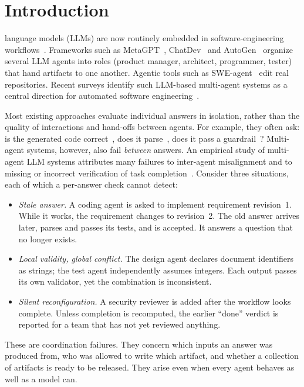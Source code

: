 \documentclass[10pt,journal,compsoc]{IEEEtran}
\theoremstyle{plain}
\theoremstyle{definition}
\begin{document}
\maketitle
\IEEEdisplaynontitleabstractindextext
\IEEEpeerreviewmaketitle

\section{Introduction}\label{sec:intro}
 language models (LLMs) are now routinely embedded in software-engineering workflows~\cite{hou2024llm4se}. Frameworks such as MetaGPT~\cite{metagpt}, ChatDev~\cite{chatdev} and AutoGen~\cite{autogen} organize several LLM agents into roles (product manager, architect, programmer, tester) that hand artifacts to one another. Agentic tools such as SWE-agent~\cite{sweagent} edit real repositories. Recent surveys identify such LLM-based multi-agent systems as a central direction for automated software engineering~\cite{he2025mas,wang2024agents}.

Most existing approaches evaluate individual answers in isolation, rather than the quality of interactions and hand-offs between agents. For example, they often ask: is the generated code correct~\cite{evalplus,swebench}, does it parse~\cite{synchromesh,outlines}, does it pass a guardrail~\cite{nemoguardrails}? Multi-agent systems, however, also fail \emph{between} answers. An empirical study of multi-agent LLM systems attributes many failures to inter-agent misalignment and to missing or incorrect verification of task completion~\cite{cemri2025mast}. Consider three situations, each of which a per-answer check cannot detect:
\begin{itemize}
\item \emph{Stale answer.} A coding agent is asked to implement requirement revision~1. While it works, the requirement changes to revision~2. The old answer arrives later, parses and passes its tests, and is accepted. It answers a question that no longer exists.
\item \emph{Local validity, global conflict.} The design agent declares document identifiers as strings; the test agent independently assumes integers. Each output passes its own validator, yet the combination is inconsistent.
\item \emph{Silent reconfiguration.} A security reviewer is added after the workflow looks complete. Unless completion is recomputed, the earlier ``done'' verdict is reported for a team that has not yet reviewed anything.
\end{itemize}
These are coordination failures. They concern which inputs an answer was produced from, who was allowed to write which artifact, and whether a collection of artifacts is ready to be released. They arise even when every agent behaves as well as a model can.
\end{document}
